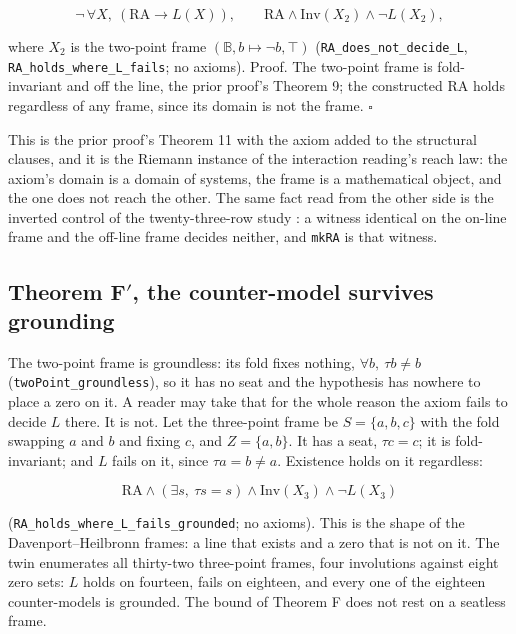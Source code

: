 \documentclass[10pt]{article}
\begin{document}
\[\neg\, \forall X,\ (\mathrm{RA} \to L(X)), \qquad \mathrm{RA} \wedge \mathrm{Inv}(X_2) \wedge \neg L(X_2),\]

where \(X_2\) is the two-point frame
\((\mathbb{B}, b \mapsto \neg b, \top)\)
(\texttt{RA\_\allowbreak does\_\allowbreak not\_\allowbreak decide\_\allowbreak L},
\texttt{RA\_\allowbreak holds\_\allowbreak where\_\allowbreak L\_\allowbreak fails};
no axioms). Proof. The two-point frame is fold-invariant and off the
line, the prior proof's Theorem 9; the constructed \(\mathrm{RA}\) holds
regardless of any frame, since its domain is not the frame. \(\square\)

This is the prior proof's Theorem 11 with the axiom added to the
structural clauses, and it is the Riemann instance of the interaction
reading's reach law: the axiom's domain is a domain of systems, the
frame is a mathematical object, and the one does not reach the other.
The same fact read from the other side is the inverted control of the
twenty-three-row study \cite{islamrows}: a witness identical on the
on-line frame and the off-line frame decides neither, and \texttt{mkRA}
is that witness.

\hypertarget{theorem-f-the-counter-model-survives-grounding}{%
\subsection{\texorpdfstring{Theorem F\('\), the counter-model survives
grounding}{Theorem F\textquotesingle, the counter-model survives grounding}}\label{theorem-f-the-counter-model-survives-grounding}}

The two-point frame is groundless: its fold fixes nothing,
\(\forall b,\ \tau b \neq b\)
(\texttt{twoPoint\_\allowbreak groundless}), so it has no seat and the
hypothesis has nowhere to place a zero on it. A reader may take that for
the whole reason the axiom fails to decide \(L\) there. It is not. Let
the three-point frame be \(S = \{a, b, c\}\) with the fold swapping
\(a\) and \(b\) and fixing \(c\), and \(Z = \{a, b\}\). It has a seat,
\(\tau c = c\); it is fold-invariant; and \(L\) fails on it, since
\(\tau a = b \neq a\). Existence holds on it regardless:

\[\mathrm{RA} \wedge (\exists s,\ \tau s = s) \wedge \mathrm{Inv}(X_3) \wedge \neg L(X_3)\]

(\texttt{RA\_\allowbreak holds\_\allowbreak where\_\allowbreak L\_\allowbreak fails\_\allowbreak grounded};
no axioms). This is the shape of the Davenport--Heilbronn frames: a line
that exists and a zero that is not on it. The twin enumerates all
thirty-two three-point frames, four involutions against eight zero sets:
\(L\) holds on fourteen, fails on eighteen, and every one of the
eighteen counter-models is grounded. The bound of Theorem F does not
rest on a seatless frame.
\end{document}
